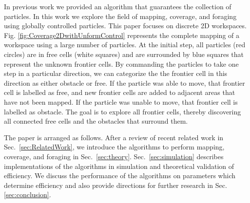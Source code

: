 In previous work \cite{mahadev2016collecting} we provided an algorithm that guarantees the collection of particles.
 In this work we explore the field of mapping, coverage, and foraging using globally controlled particles. 
 This paper focuses on discrete 2D workspaces.
Fig. \ref{fig:Coverage2DwithUnformControl} represents the complete mapping of a workspace using a large number of particles.  
At the initial step, all  particles (red circles) are in free cells (white squares) and are surrounded by blue squares that represent the unknown frontier cells.
By commanding the particles to take one step in a particular direction, we can categorize the the frontier cell in this direction as either obstacle or free.
 If the particle was able to move, that frontier cell is labelled as free, and new frontier cells are added to adjacent areas that have not been mapped.
 If the particle was unable to move, that frontier cell is labelled as obstacle.
The goal is to explore all  frontier cells, thereby discovering all connected free cells and the obstacles that surround them. 

The paper is arranged as follows. 
After a review of recent related work in Sec.~\ref{sec:RelatedWork}, we introduce the algorithms to perform mapping, coverage, and foraging in Sec.~\ref{sec:theory}.
 Sec.~\ref{sec:simulation} describes implementations of the algorithms in simulation and theoretical validation of efficiency. 
  We discuss the performance of the algorithms on parameters which determine efficiency and also provide directions for further research in Sec.  \ref{sec:conclusion}.


